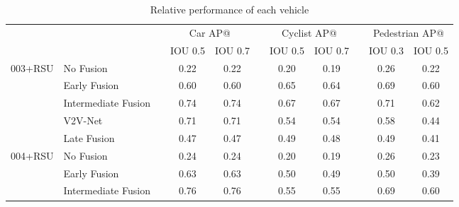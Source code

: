 \begin{table*}[ht]
\centering
\caption{Relative performance of each vehicle}
\label{tab:v2x-relative}
\begin{tabular}{@{}lllcclcclcc@{}}
\toprule
                                                &                      &  & \multicolumn{2}{c}{Car AP@} &  & \multicolumn{2}{c}{Cyclist AP@} &  & \multicolumn{2}{c}{Pedestrian AP@} \\ \cmidrule(lr){4-5} \cmidrule(lr){7-8} \cmidrule(l){10-11} 
                                                &                      &  & IOU 0.5      & IOU 0.7      &  & IOU 0.5        & IOU 0.7        &  & IOU 0.3          & IOU 0.5         \\ \midrule
\multicolumn{1}{l|}{\multirow{5}{*}{003+RSU}}   & No Fusion &  & 0.22         & 0.22         &  & 0.20           & 0.19           &  & 0.26             & 0.22            \\
\multicolumn{1}{l|}{}                           & Early Fusion         &  & 0.60         & 0.60         &  & 0.65           & 0.64           &  & 0.69             & 0.60            \\
\multicolumn{1}{l|}{}                           & Intermediate Fusion  &  & 0.74         & 0.74         &  & 0.67           & 0.67           &  & 0.71             & 0.62            \\
\multicolumn{1}{l|}{}                           & V2V-Net              &  & 0.71         & 0.71         &  & 0.54           & 0.54           &  & 0.58             & 0.44            \\
\multicolumn{1}{l|}{}                           & Late Fusion          &  & 0.47         & 0.47         &  & 0.49           & 0.48           &  & 0.49             & 0.41            \\ \midrule
\multicolumn{1}{l|}{\multirow{5}{*}{004+RSU}}   & No Fusion &  & 0.24         & 0.24         &  & 0.20           & 0.19           &  & 0.26             & 0.23            \\
\multicolumn{1}{l|}{}                           & Early Fusion         &  & 0.63         & 0.63         &  & 0.50           & 0.49           &  & 0.50             & 0.39            \\
\multicolumn{1}{l|}{}                           & Intermediate Fusion  &  & 0.76         & 0.76         &  & 0.55           & 0.55           &  & 0.69             & 0.60            \\

\end{tabular}
\end{table*}
